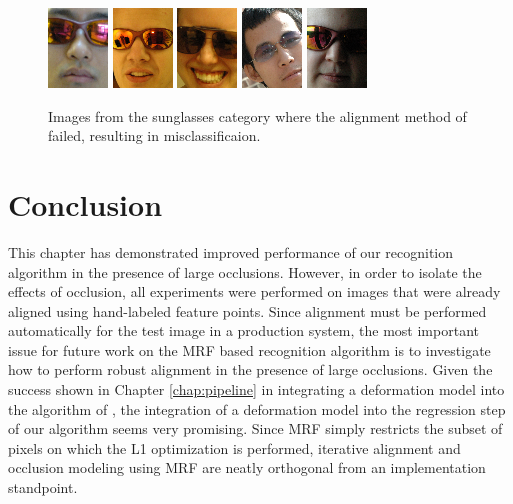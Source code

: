 \begin{figure}
\centering
\newcommand{\imagewidth}{.8in}
\includegraphics[width=\imagewidth]{figures_iccv/sunglass_examples/failed/1.png}
\includegraphics[width=\imagewidth]{figures_iccv/sunglass_examples/failed/2.png}
\includegraphics[width= \imagewidth]{figures_iccv/sunglass_examples/failed/3.png}
\includegraphics[width= \imagewidth]{figures_iccv/sunglass_examples/failed/4.png}
\includegraphics[width= \imagewidth]{figures_iccv/sunglass_examples/failed/5.png}
\caption{Images from the sunglasses category where the alignment method of \cite{Wagner2009-CVPR} failed, resulting in misclassificaion.} \label{fig:registration} \vspace{0mm}
\end{figure}

\section{Conclusion} This chapter has demonstrated improved performance of our
recognition algorithm in the presence of large occlusions.  However, in order
to isolate the effects of occlusion, all experiments were performed on images
that were already aligned using hand-labeled feature points.  Since alignment
must be performed automatically for the test image in a production system, the
most important issue for future work on the MRF based recognition algorithm is
to investigate how to perform robust alignment in the presence of large
occlusions.  Given the success shown in Chapter \ref{chap:pipeline} in
integrating a deformation model into the algorithm of \cite{Wright2009-PAMI},
the integration of a deformation model into the regression step of our
algorithm \cite{Wagner2009-CVPR} seems very promising.  Since MRF simply
restricts the subset of pixels on which the L1 optimization is performed, 
iterative alignment and occlusion modeling using MRF are neatly
orthogonal from an implementation standpoint.  


